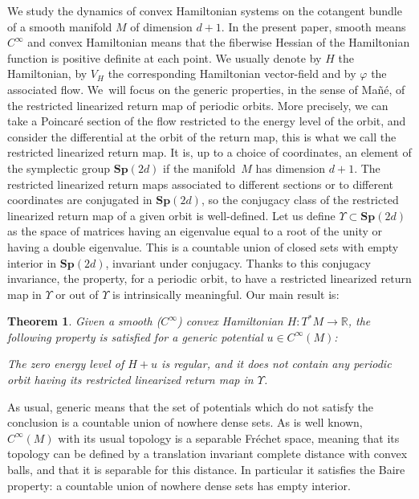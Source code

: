 \documentclass[10pt]{amsart}
\newcommand{\Rm}{\mathbb{R}}
\newcommand{\Sp}{\mathbf{Sp}}
\theoremstyle{plain}
\newtheorem{thm}{Theorem}
\theoremstyle{definition}
\begin{document}
We study the dynamics of convex Hamiltonian systems on the cotangent bundle of a smooth manifold $M$ of dimension $d+1$.
In the present paper, smooth means $C^{\infty}$ and convex Hamiltonian means that the fiberwise Hessian
of the Hamiltonian function is positive definite at each point.
We usually denote by $H$ the Hamiltonian, by $V_H$ the corresponding Hamiltonian vector-field and by $\varphi$ the associated flow. We~will focus on the generic properties, in the sense of Mañé, of the restricted linearized return map of periodic orbits.
More precisely, we can take a Poincaré section
of the flow restricted to the energy level of the orbit, and consider the differential at the orbit of the return map, this is what we call the restricted linearized return map.
It is, up to a choice of coordinates, an element of the symplectic group $\Sp(2d)$ if
the manifold~$M$ has dimension $d+1$.
The restricted linearized return maps associated to different sections or to different coordinates are conjugated in $\Sp(2d)$, so the conjugacy class of the restricted linearized return map of a given orbit is well-defined.
Let us define $\Upsilon \subset \Sp(2d)$ as the space of matrices having an eigenvalue equal to a root of the unity or having a double eigenvalue. This is a countable union of closed sets with empty interior in $\Sp(2d)$, invariant under conjugacy.
Thanks to this conjugacy invariance, the property, for a periodic orbit, to have a restricted linearized return map in
$\Upsilon$ or out of $\Upsilon$ is intrinsically meaningful.
Our main result is:


\begin{thm}\label{thm-g1}
Given a smooth ($C^{\infty}$) convex Hamiltonian $H: T^*M\rightarrow \Rm$,
the following property is satisfied for a generic potential $u\in C^{\infty}(M)$:

The zero energy level of $H+u$ is regular, and it does not contain any periodic orbit having its restricted linearized return map in $\Upsilon$.
\end{thm}


As usual, generic means that the set of potentials which do not satisfy the conclusion is a countable union of nowhere dense sets. As is well known, $C^{\infty}(M)$ with its usual topology is a separable Fréchet space,
meaning that its topology can be defined by a translation invariant complete distance with convex balls, and that it is separable for this distance. In particular it satisfies the Baire property: a countable union of nowhere dense sets has empty interior.
\end{document}
